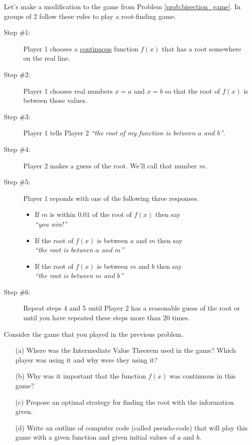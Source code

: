 \begin{problem}
    Let's make a modification to the game from Problem \ref{prob:bisection_game}.  In
    groups of 2 follow these rules to play a root-finding game.
    \begin{description}
        \item[Step \#1:] Player 1 chooses a \underline{continuous} function $f(x)$ that
            has a root somewhere on the real line.  
        \item[Step \#2:] Player 1 chooses real numbers $x=a$ and $x=b$ so that the root of
            $f(x)$ is between those values.
        \item[Step \#3:] Player 1 tells Player 2 {\it ``the root of my function is between
            $a$ and $b$''}.
        \item[Step \#4:] Player 2 makes a guess of the root.  We'll call that number $m$.
        \item[Step \#5:] Player 1 reponds with one of the following three responses.
            \begin{itemize}
                \item If $m$ is within $0.01$ of the root of $f(x)$ then say \\ {\it ``you
                    win!''}
                \item If the root of $f(x)$ is between $a$ and $m$ then say \\ {\it ``the
                    root is between $a$ and $m$''}
                \item If the root of $f(x)$ is between $m$ and $b$ then say \\ {\it ``the
                    root is between $m$ and $b$''}
            \end{itemize}
        \item[Step \#6:] Repeat steps 4 and 5 until Player 2 has a reasonable guess of the
            root or until you have repeated these steps more than 20 times.
    \end{description}
\end{problem}

\begin{problem}
    Consider the game that you played in the previous problem.
    \begin{enumerate}
        \item[(a)] Where was the Intermediate Value Theorem used in the game?  Which
            player was using it and why were they using it?
        \item[(b)] Why was it important that the function $f(x)$ was continuous in this
            game?
        \item[(c)] Propose an optimal strategy for finding the root with the information
            given.
        \item[(d)] Write an outline of computer code (called pseudo-code) that will play
            this game with a given function and given initial values of $a$ and $b$.
    \end{enumerate}
\end{problem}

